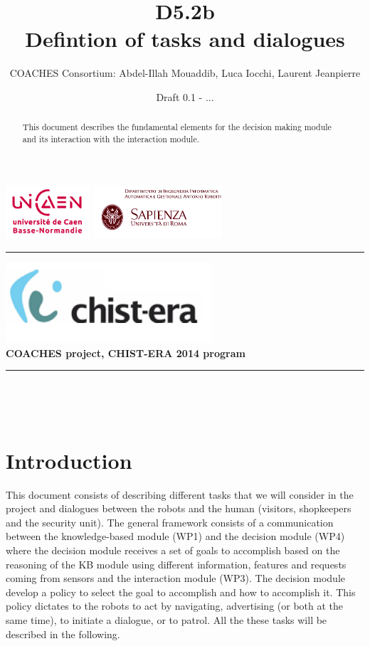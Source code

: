 \documentclass{article}
\title{D5.2b\\ Defintion of tasks and dialogues}
\author{COACHES Consortium: Abdel-Illah Mouaddib, Luca Iocchi, Laurent Jeanpierre}
\date{Draft 0.1 - ...}
\newcommand{\makemadtitle}{
  \hrule
  \vspace{.5em}
  \noindent
  \begin{center}
  \textbf{
  {\centering\includegraphics[height=3cm,bb=0 0 371 145]{../fig/logoCHISTERA2014.png}}\\
   {\centering\Large COACHES project, CHIST-ERA 2014 program}
  }
  \end{center}
  \vspace{.5em}
 
  \hrule
  \vspace{3em}
  \begin{center}
    \begin{Large}\textbf{\usebox{\notetitle}}\end{Large}\\[2em]
    \begin{large}\usebox{\noteauthor}\\ [2em]
    \usebox{\notedate}\end{large}
  \end{center}
  \vspace{3em}
}
\begin{document}
\includegraphics[height=2cm]{../fig/logoUNICAEN.jpg}
\includegraphics[height=2cm]{../fig/logoSapienza.png}


\makemadtitle

\vspace*{1.0in}
\begin{abstract}
 This document describes the fundamental elements for the decision making module and its interaction with the interaction module. 
  \end{abstract}

\vspace*{1.5in}

\newpage
\section{Introduction}
This document consists of describing different tasks that we will consider in the project and dialogues between the robots and the human (visitors, shopkeepers and the security unit).  The general framework consists of a communication between the knowledge-based module (WP1) and the decision module (WP4) where the decision module receives a set of goals to accomplish based on the reasoning of the KB module using different information, features and requests coming from sensors and the interaction module (WP3). The decision module develop a policy to select the goal to accomplish and how to accomplish it. This policy dictates to the robots to act by navigating, advertising (or both at the same time), to initiate a dialogue, or to patrol. All the these tasks will be described in the following. 
\end{document}
